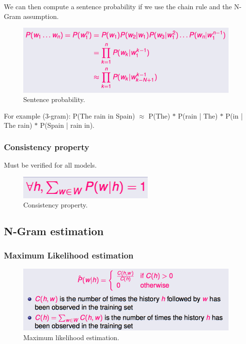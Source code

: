 We can then compute a sentence probability if we use the chain rule and the N-Gram assumption.

\begin{figure}[htp]
	\centering
	\includegraphics[scale=0.4]{images/10_sentence.png}
 	\caption{Sentence probability.}
\end{figure}

For example (3-gram): P(The rain in Spain) $\approx$ P(The) $*$ P(rain | The) $*$ P(in | The rain) $*$ P(Spain | rain in).

\subsubsection{Consistency property}

Must be verified for all models.

\begin{figure}[htp]
	\centering
	\includegraphics[scale=0.5]{images/11_consistency.png}
 	\caption{Consistency property.}
\end{figure}
\subsection{N-Gram estimation}

\subsubsection{Maximum Likelihood estimation}

\begin{figure}[htp]
	\centering
	\includegraphics[scale=0.5]{images/12_likelihood.png}
 	\caption{Maximum likelihood estimation.}
\end{figure}


